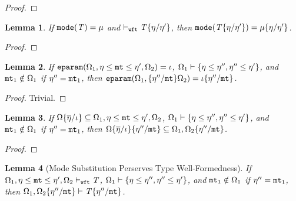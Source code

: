 \documentclass[onecolumn,nocopyrightspace]{sigplanconf}
\newtheorem{lemma}{Lemma}
\theoremstyle{lessintrusive}
\theoremstyle{plain}
\theoremstyle{custom}
\def\econsexp#1#2#3{#1\msub#2\msub#3}
\begin{document}
\begin{proof}
\end{proof}

\begin{lemma}
\label{pf:modesubstitution-preserves-mode}
If $\mathtt{mode}(\mathit{T}) = \mu$ and $\vdash_{\tt wft} \mathit{T}\{\eta/\eta'\}$, then $\mathtt{mode}(\mathit{T}\{\eta/\eta'\}) = \mu\{\eta/\eta'\}$.
\end{lemma}

\begin{proof}
\end{proof}


\begin{lemma}
\label{pf:modesubstitution-preserves-eparam}
If $\Feparam(\espec_{1},\econsexp{\basemode}{\mtvar}{\basemode'},\espec_{2}) = \iota$, $\Omega_{1} \vdash \{\eta\leq\eta'',\eta''\leq\eta'\}$, and $\mathtt{mt}_{1} \notin \Omega_{1}$ if $\eta'' = \mathtt{mt}_{1}$, then $\mathtt{eparam}(\Omega_{1},\{\eta''/\mathtt{mt}\}\Omega_{2}) = \iota\{\eta''/\mathtt{mt}\}$.
\end{lemma}

\begin{proof}
Trivial.
\end{proof}

\begin{lemma}
\label{pf:modesubstitution-preserves-subset}
If $\espec\subst{\listi}{\overline{\basemode}}\subseteq\espec_{1},\econsexp{\basemode}{\mtvar}{\basemode'},\espec_{2}$, $\Omega_{1} \vdash \{\eta\leq\eta'',\eta''\leq\eta'\}$, and $\mathtt{mt}_{1} \notin \Omega_{1}$ if $\eta'' = \mathtt{mt}_{1}$, then $\Omega\{\overline{\eta}/\iota\}\{\eta''/\mathtt{mt}\}\subseteq\Omega_{1},\Omega_{2}\{\eta''/\mathtt{mt}\}$.
\end{lemma}

\begin{proof}
\end{proof} 

\begin{lemma}[Mode Substitution Perserves Type Well-Formedness]
\label{pf:modesubstitution-preserves-wellformedness}
If $\espec_{1},\econsexp{\basemode}{\mtvar}{\basemode'},\espec_{2} \judgewft \bt$, $\Omega_{1} \vdash \{\eta\leq\eta'',\eta''\leq\eta'\}$, and $\mathtt{mt}_{1} \notin \Omega_{1}$ if $\eta'' = \mathtt{mt}_{1}$, then $\Omega_{1},\Omega_{2}\{\eta''/\mathtt{mt}\} \vdash \mathit{T}\{\eta''/\mathtt{mt}\}$.
\end{lemma}
\end{document}
